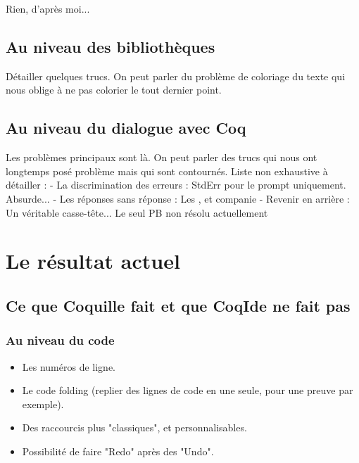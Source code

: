         Rien, d'après moi...
        
    \subsection{Au niveau des bibliothèques}
    
        Détailler quelques trucs.
        On peut parler du problème de coloriage du texte qui nous oblige à ne pas colorier le tout dernier point.
        
    \subsection{Au niveau du dialogue avec Coq}
    
        Les problèmes principaux sont là. On peut parler des trucs qui nous ont longtemps posé problème mais qui sont contournés.
        Liste non exhaustive à détailler :
        - La discrimination des erreurs : StdErr pour le prompt uniquement. Absurde...
        - Les réponses sans réponse : Les ,  et companie
        - Revenir en arrière : Un véritable casse-tête... Le seul PB non résolu actuellement
        
\section{Le résultat actuel}

    \subsection{Ce que Coquille fait et que CoqIde ne fait pas}
    
        \subsubsection{Au niveau du code}
        
            \begin{itemize}
                \item Les numéros de ligne.
                \item Le code folding (replier des lignes de code en une seule, pour une preuve par exemple).
                \item Des raccourcis plus "classiques", et personnalisables.
                \item Possibilité de faire "Redo" après des "Undo".
            \end{itemize}
            
